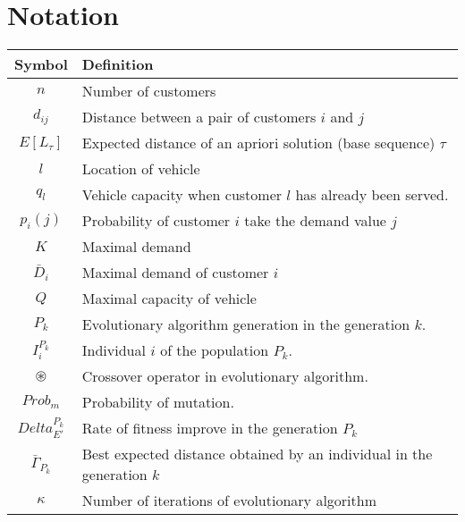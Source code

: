 \chapter*{Notation}
\label{chap:notation}

\begin{table}
 \begin{tabular}{|c|l|}
  \hline
  \textbf{Symbol} & \textbf{Definition}\\
  \hline
  $n$ & Number of customers\\
  $d_{ij}$ & Distance between a pair of customers $i$ and $j$\\
  $E[L_{\tau}]$ & Expected distance of an apriori solution (base sequence) $\tau$\\
  $l$ & Location of vehicle\\
  $q_l$ & Vehicle capacity when customer $l$ has already been served.\\
  $p_i(j)$ & Probability of customer $i$ take the demand value $j$\\
  $K$ & Maximal demand\\
  $\bar{D}_i$ & Maximal demand of customer $i$\\
  $Q$ & Maximal capacity of vehicle\\
  $P_k$ & Evolutionary algorithm generation in the generation $k$.\\
  $I^{P_k}_i$ & Individual $i$ of the population $P_k$.\\
  $\circledast$ & Crossover operator in evolutionary algorithm.\\
  $Prob_m$ & Probability of mutation.\\
  $Delta^{P_k}_{E'}$ & Rate of fitness improve in the generation $P_k$\\
  $\bar{\Gamma}_{P_k}$ & Best expected distance obtained by an individual in the generation $k$\\
  $\kappa$ & Number of iterations of evolutionary algorithm\\
  \hline
 \end{tabular}

\end{table}
